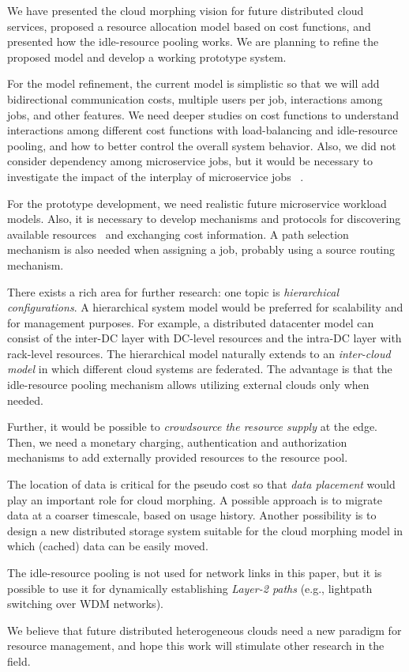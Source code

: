 
We have presented the cloud morphing vision for future distributed
cloud services,
proposed a resource allocation model based on cost functions,
and presented how the idle-resource pooling works.
We are planning to refine the proposed model and develop a working
prototype system.

For the model refinement,
the current model is simplistic so that we will add bidirectional
communication costs,
multiple users per job, interactions among jobs, and other features.
We need deeper studies on cost functions
to understand interactions among different cost functions
with load-balancing and idle-resource pooling,
and how to better control the overall system behavior.
Also, we did not consider dependency among microservice jobs, but it would be
necessary to investigate the impact of the interplay of microservice
jobs ~\cite{Suresh-SOA-SOCC2017}.

For the prototype development,
we need realistic future microservice workload models.
Also, it is necessary to develop mechanisms and protocols for
discovering available resources~\cite{Albrecht2008} and exchanging
cost information.
A path selection mechanism is also needed when assigning a job,
probably using a source routing mechanism.

There exists a rich area for further research:
one topic is {\em hierarchical configurations}.
A hierarchical system model would be preferred for scalability
and for management purposes.
For example, a distributed datacenter model can consist of
the inter-DC layer with DC-level resources and the intra-DC layer
with rack-level resources.
The hierarchical model naturally extends to
an {\em inter-cloud model} in which different cloud systems are
federated.
The advantage is that the idle-resource pooling mechanism allows
utilizing external clouds only when needed.

Further, it would be possible to {\em crowdsource the resource supply}
at the edge. 
Then, we need a monetary charging, authentication and authorization
mechanisms to add externally provided resources to the resource pool.

The location of data is critical for the pseudo cost so that
{\em data placement} would play an important role for cloud morphing. 
A possible approach is to migrate data at a coarser timescale, based
on usage history.
Another possibility is to design a new distributed storage system
suitable for the cloud morphing model in which (cached) data can be
easily moved.

The idle-resource pooling is not used for network links in this paper, but
it is possible to use it for dynamically establishing {\em Layer-2 paths}
(e.g., lightpath switching over WDM networks).

We believe that future distributed heterogeneous clouds need a new
paradigm for resource management, and hope this work will stimulate
other research in the field.
